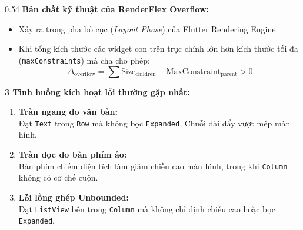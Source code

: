 \documentclass[aspectratio=169, 10pt]{beamer}
\newcommand{\SlideHeader}[2]{%
  \noindent{\textcolor{AccentOrange}{\textbf{\footnotesize #1}}}\\[0.08cm]
  \noindent{\Large \textbf{\textcolor{NavyTitle}{#2}}}\\[0.22cm]
}
\begin{document}
\begin{frame}
  \SlideHeader{CƠ SỞ LÝ THUYẾT}{Nguyên Nhân \& Cơ Chế Gây Ra Lỗi Overflow}

  \begin{columns}[T]
    \begin{column}{0.54\textwidth}
      \textbf{Bản chất kỹ thuật của RenderFlex Overflow:}
      \begin{itemize}
        \item Xảy ra trong pha bố cục (\textit{Layout Phase}) của Flutter Rendering Engine.
        \item Khi tổng kích thước các widget con trên trục chính lớn hơn kích thước tối đa (\texttt{maxConstraints}) mà cha cho phép:
        $$\Delta_{\text{overflow}} = \sum \text{Size}_{\text{children}} - \text{MaxConstraint}_{\text{parent}} > 0$$
      \end{itemize}

      \vspace{0.15cm}
      \textbf{3 Tình huống kích hoạt lỗi thường gặp nhất:}
      \begin{enumerate}
        \item \textbf{Tràn ngang do văn bản:}\\
        Đặt \texttt{Text} trong \texttt{Row} mà không bọc \texttt{Expanded}. Chuỗi dài đẩy vượt mép màn hình.
        \item \textbf{Tràn dọc do bàn phím ảo:}\\
        Bàn phím chiếm diện tích làm giảm chiều cao màn hình, trong khi \texttt{Column} không có cơ chế cuộn.
        \item \textbf{Lỗi lồng ghép Unbounded:}\\
        Đặt \texttt{ListView} bên trong \texttt{Column} mà không chỉ định chiều cao hoặc bọc \texttt{Expanded}.
      \end{enumerate}
    \end{column}


\end{columns}
\end{frame}
\end{document}
